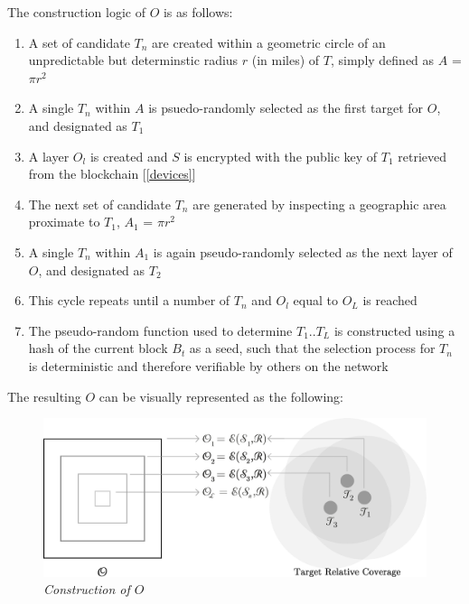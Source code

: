 \documentclass[letterpaper,11pt]{article}
\begin{document}
The construction logic of $\mathit{O}$ is as follows:

\begin{enumerate}
  \item A set of candidate $\mathit{T_n}$ are created within a geometric circle of an unpredictable but determinstic radius $\mathit{r}$ (in miles) of $\mathit{T}$, simply defined as $\mathit{A}$ = $\mathit{\pi}$$\mathit{r^2}$
  \item A single $\mathit{T_n}$ within $\mathit{A}$ is psuedo-randomly selected as the first target for $\mathit{O}$, and designated as $\mathit{T_1}$
  \item A layer $\mathit{O_l}$ is created and $\mathit{S}$ is encrypted with the public key of $\mathit{T_1}$ retrieved from the blockchain [\ref{devices}]
  \item The next set of candidate $\mathit{T_n}$ are generated by inspecting a geographic area proximate to $\mathit{T_1}$, $\mathit{A_1}$ = $\mathit{\pi}$$\mathit{r^2}$
  \item A single $\mathit{T_n}$ within $\mathit{A_1}$ is again pseudo-randomly selected as the next layer of $\mathit{O}$, and designated as $\mathit{T_2}$
  \item This cycle repeats until a number of $\mathit{T_n}$ and $\mathit{O_l}$ equal to $\mathit{O_L}$ is reached
  \item The pseudo-random function used to determine $\mathit{T_1}$..$\mathit{T_L}$ is constructed using a hash of the current block $\mathit{B_t}$ as a seed, such that the selection process for $\mathit{T_n}$ is deterministic and therefore verifiable by others on the network
\end{enumerate}

The resulting $\mathit{O}$ can be visually represented as the following:\newline

\begin{figure}[H]
	\begin{center}
  		\includegraphics[width=\textwidth]{diagram3.eps}
  		\caption{\textit{Construction of $\mathit{O}$}}
  		\label{fig:onion-packet}
 	\end{center}
\end{figure}
\end{document}
